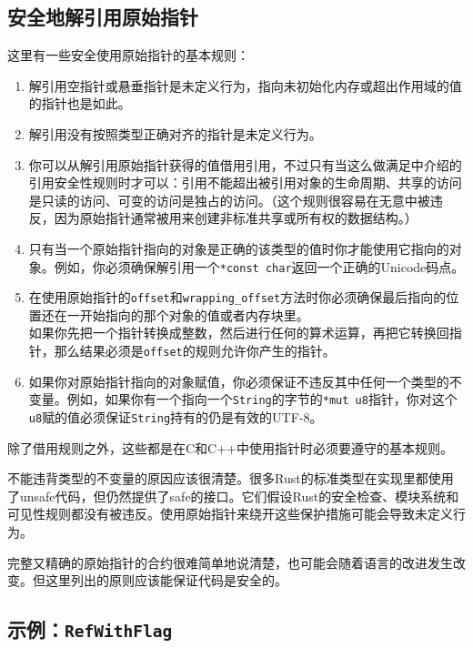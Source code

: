 \subsection{安全地解引用原始指针}\label{DerefRawP}
这里有一些安全使用原始指针的基本规则：
\begin{enumerate}
    \item 解引用空指针或悬垂指针是未定义行为，指向未初始化内存或超出作用域的值的指针也是如此。
    \item 解引用没有按照类型正确对齐的指针是未定义行为。
    \item 你可以从解引用原始指针获得的值借用引用，不过只有当这么做满足中介绍的引用安全性规则时才可以：引用不能超出被引用对象的生命周期、共享的访问是只读的访问、可变的访问是独占的访问。（这个规则很容易在无意中被违反，因为原始指针通常被用来创建非标准共享或所有权的数据结构。）
    \item 只有当一个原始指针指向的对象是正确的该类型的值时你才能使用它指向的对象。例如，你必须确保解引用一个\texttt{*const char}返回一个正确的Unicode码点。
    \item 在使用原始指针的\texttt{offset}和\texttt{wrapping\_offset}方法时你必须确保最后指向的位置还在一开始指向的那个对象的值或者内存块里。\\ 如果你先把一个指针转换成整数，然后进行任何的算术运算，再把它转换回指针，那么结果必须是\texttt{offset}的规则允许你产生的指针。
    \item 如果你对原始指针指向的对象赋值，你必须保证不违反其中任何一个类型的不变量。例如，如果你有一个指向一个\texttt{String}的字节的\texttt{*mut u8}指针，你对这个\texttt{u8}赋的值必须保证\texttt{String}持有的仍是有效的UTF-8。
\end{enumerate}

除了借用规则之外，这些都是在C和C++中使用指针时必须要遵守的基本规则。

不能违背类型的不变量的原因应该很清楚。很多Rust的标准类型在实现里都使用了unsafe代码，但仍然提供了safe的接口。它们假设Rust的安全检查、模块系统和可见性规则都没有被违反。使用原始指针来绕开这些保护措施可能会导致未定义行为。

完整又精确的原始指针的合约很难简单地说清楚，也可能会随着语言的改进发生改变。但这里列出的原则应该能保证代码是安全的。

\subsection{示例：\texttt{RefWithFlag}}\label{RefWithFlag}
